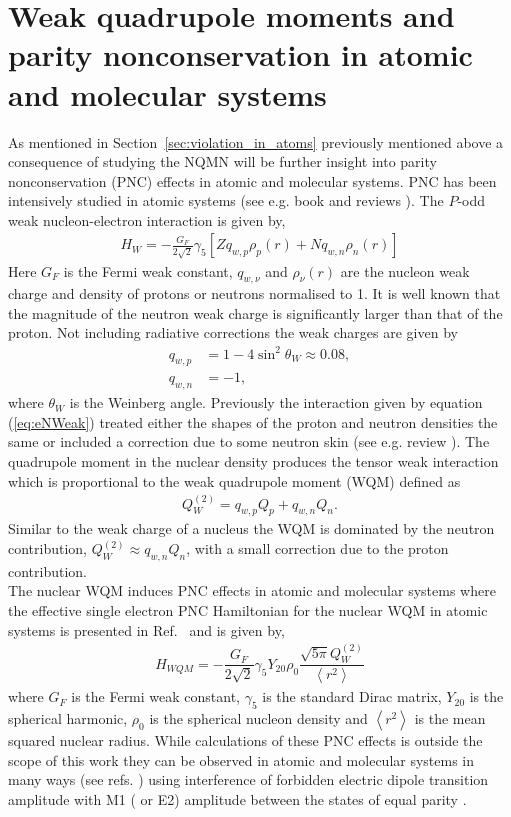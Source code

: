 \documentclass[10pt,a4paper, twoside]{report}
\begin{document}
\section{Weak quadrupole moments and parity nonconservation in atomic and molecular systems\label{sec:PNC}} 
As mentioned in Section~\ref{sec:violation_in_atoms} previously mentioned above a consequence of studying the NQMN will be further insight into parity nonconservation (PNC) effects in atomic and molecular systems. PNC has been intensively studied in atomic systems (see e.g. book \cite{KhriplovichPNC} and reviews \cite{RobertsReview, GingesReview}).  The $P$-odd weak nucleon-electron interaction is given by,
\begin{align} \label{eq:eNWeak}
H_W = -\frac{G_F}{2\sqrt{2}}\gamma_{5}\left[Zq_{w, p}\rho_{p}(r) + Nq_{w, n}\rho_{n}(r)\right]
\end{align}
Here $G_F$ is the Fermi weak constant, $q_{w,\nu}$ and $\rho_{\nu}(r)$ are the nucleon weak charge  and density of protons or neutrons  normalised to 1. It is well known that the magnitude of the neutron weak charge is significantly larger than that of the proton. Not including radiative corrections the weak charges  are given by 
\begin{align*}
q_{w,p} &= 1 - 4\sin^2\theta_W \approx 0.08 ,\\
q_{w,n} &= -1,
\end{align*}
where $\theta_W$ is the Weinberg angle.  Previously the interaction given by equation (\ref{eq:eNWeak}) treated either the shapes of the proton and neutron densities  the same  or included a correction due to some neutron skin (see e.g. review \cite{RobertsReview}).  The quadrupole moment in the nuclear density produces the tensor weak interaction which is proportional to the weak quadrupole moment (WQM) defined as  \cite{FDC17}
\begin{align*}
Q_{W}^{(2)} = q_{w,p}Q_{p} + q_{w,n}Q_n.
\end{align*}
Similar to the weak charge of a nucleus the WQM is dominated by the neutron contribution,  $Q_{W}^{(2)} \approx q_{w,n}Q_n$,  with a small correction due to the proton contribution. \\

The nuclear WQM induces PNC effects in atomic and molecular systems where the effective single electron  PNC Hamiltonian for the nuclear WQM in atomic systems is presented in Ref.~\cite{FDC17} and is given by,
\begin{align*}
H_{WQM}=-\dfrac{G_F}{2\sqrt{2}}\gamma_5Y_{20}\rho_{0}\dfrac{\sqrt{5\pi}Q_{W}^{(2)}}{\left<r^2\right>}
\end{align*}
where $G_F$ is the Fermi weak constant, $\gamma_5$ is the standard Dirac matrix, $Y_{20}$ is the spherical harmonic, $\rho_0$ is the spherical nucleon density and $\left<r^2\right>$ is the mean squared nuclear radius. While calculations of these PNC effects is outside the scope of this work they can be observed in atomic and molecular systems in many ways (see refs. \cite{FDC17, RobertsReview, KhriplovichPNC, GingesReview}) using interference of forbidden electric dipole transition amplitude with M1 ( or E2) amplitude between the states of equal parity \cite{FDC17}.
\end{document}
